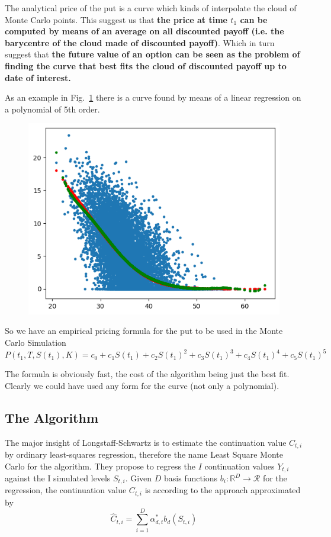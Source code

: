 \documentclass[12pt,a4paper]{article}
\begin{document}
The analytical price of the put is a curve which kinds of interpolate the cloud of Monte Carlo points. This suggest us that
\textbf{the price at time $t_1$ can be computed by means of an average on all discounted payoff (i.e. the barycentre of the cloud made of discounted payoff)}.
Which in turn suggest that \textbf{the future value of an option can be seen as the problem of finding the curve that best fits the cloud of discounted payoff up to date of interest.}

As an example in Fig.~\ref{fig:continuation_function} there is a curve found by means of a linear regression on a polynomial of 5th order.

\begin{figure}[htbp]
	\begin{center}
		\includegraphics[width=0.5\linewidth]{addons/continuation_function}
	\end{center}
	\label{fig:continuation_function}
\end{figure}

So we have an empirical pricing formula for the put to be used in the Monte Carlo Simulation
\begin{equation}
	P(t_1,T,S(t_1),K)=c_0+c_1 S(t_1) + c_2 S(t_1)^2 + c_3 S(t_1)^3 + c_4 S(t_1)^4 + c_5 S(t_1)^5
\end{equation}

The formula is obviously fast, the cost of the algorithm being just the best fit. Clearly we could have used any form for the curve (not only a polynomial). 

\subsection{The Algorithm}
The major insight of Longstaff-Schwartz is to estimate the continuation value $C_{t,i}$ by ordinary least-squares regression, therefore the name Least Square Monte Carlo for the algorithm. 
They propose to regress the $I$ continuation values $Y_{t,i}$ against the I simulated levels $S_{t,i}$. Given $D$ basis functions $b_i:\mathbb{R}^D\rightarrow\mathcal{R}$ for the regression, the continuation value $C_{t,i}$ is according to the approach approximated by
\begin{equation}
	\hat{C}_{t,i}=\sum_{i=1}^D \alpha^*_{d,t}b_d(S_{t,i})
	\label{eq:continuation_approx}
\end{equation}
\end{document}
